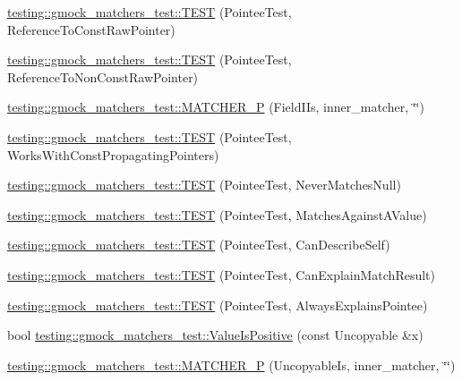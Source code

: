 \begin{DoxyCompactItemize}
\item 
\mbox{\hyperlink{namespacetesting_1_1gmock__matchers__test_aebba40e49fe790490ba88984fdc7c7a6}{testing\+::gmock\+\_\+matchers\+\_\+test\+::\+T\+E\+ST}} (Pointee\+Test, Reference\+To\+Const\+Raw\+Pointer)
\item 
\mbox{\hyperlink{namespacetesting_1_1gmock__matchers__test_a2d2296f6b23130be225b8df48746dfd5}{testing\+::gmock\+\_\+matchers\+\_\+test\+::\+T\+E\+ST}} (Pointee\+Test, Reference\+To\+Non\+Const\+Raw\+Pointer)
\item 
\mbox{\hyperlink{namespacetesting_1_1gmock__matchers__test_a3d3f285bba1766bf9daf840a16e79924}{testing\+::gmock\+\_\+matchers\+\_\+test\+::\+M\+A\+T\+C\+H\+E\+R\+\_\+P}} (Field\+I\+Is, inner\+\_\+matcher, \char`\"{}\char`\"{})
\item 
\mbox{\hyperlink{namespacetesting_1_1gmock__matchers__test_a9d851a5bb597fa45b5d1cf3f295398e8}{testing\+::gmock\+\_\+matchers\+\_\+test\+::\+T\+E\+ST}} (Pointee\+Test, Works\+With\+Const\+Propagating\+Pointers)
\item 
\mbox{\hyperlink{namespacetesting_1_1gmock__matchers__test_ac778a9cebf9306a5efd27cc1186d8269}{testing\+::gmock\+\_\+matchers\+\_\+test\+::\+T\+E\+ST}} (Pointee\+Test, Never\+Matches\+Null)
\item 
\mbox{\hyperlink{namespacetesting_1_1gmock__matchers__test_afe22e8230dc7a34498e4b2f91dcdd7cd}{testing\+::gmock\+\_\+matchers\+\_\+test\+::\+T\+E\+ST}} (Pointee\+Test, Matches\+Against\+A\+Value)
\item 
\mbox{\hyperlink{namespacetesting_1_1gmock__matchers__test_ac8b9baa938635d587f0b0df1073208e2}{testing\+::gmock\+\_\+matchers\+\_\+test\+::\+T\+E\+ST}} (Pointee\+Test, Can\+Describe\+Self)
\item 
\mbox{\hyperlink{namespacetesting_1_1gmock__matchers__test_a263ede06f6b32a625bb40e4f4c58c8dc}{testing\+::gmock\+\_\+matchers\+\_\+test\+::\+T\+E\+ST}} (Pointee\+Test, Can\+Explain\+Match\+Result)
\item 
\mbox{\hyperlink{namespacetesting_1_1gmock__matchers__test_a00128de027ff6f49f82a7011dd346d43}{testing\+::gmock\+\_\+matchers\+\_\+test\+::\+T\+E\+ST}} (Pointee\+Test, Always\+Explains\+Pointee)
\item 
bool \mbox{\hyperlink{namespacetesting_1_1gmock__matchers__test_a7c429b4fa8a7835724d9e28033e908b2}{testing\+::gmock\+\_\+matchers\+\_\+test\+::\+Value\+Is\+Positive}} (const Uncopyable \&x)
\item 
\mbox{\hyperlink{namespacetesting_1_1gmock__matchers__test_a55a8eba9beb33753baf7690d4cb9cd7e}{testing\+::gmock\+\_\+matchers\+\_\+test\+::\+M\+A\+T\+C\+H\+E\+R\+\_\+P}} (Uncopyable\+Is, inner\+\_\+matcher, \char`\"{}\char`\"{})

\end{DoxyCompactItemize}
